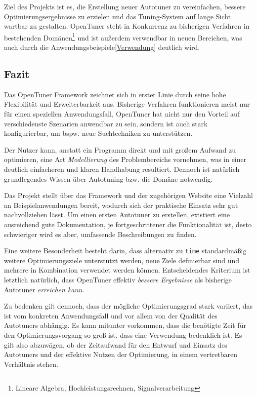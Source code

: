 \documentclass[a4paper,11pt]{scrartcl}
\newcommand{\bspw}{\mbox{bspw.}\xspace}
\newcommand{\bzw}{\mbox{bzw.}\xspace}
\begin{document}
Ziel des Projekts ist es, die Erstellung neuer Autotuner zu vereinfachen, bessere
Optimierungsergebnisse zu erzielen und das Tuning-System auf lange Sicht wartbar
zu gestalten. OpenTuner steht in Konkurrenz zu bisherigen Verfahren in 
bestehenden Domänen\footnote{Lineare Algebra, Hochleistungsrechnen, Signalverarbeitung}
und ist außerdem verwendbar in neuen Bereichen, was auch durch die Anwendungsbeispiele\ref{Verwendung} 
deutlich wird.

\subsection{Fazit}
Das OpenTuner Framework zeichnet sich in erster Linie durch seine hohe Flexibilität
und Erweiterbarkeit aus. Bisherige Verfahren funktionieren meist nur für einen speziellen
Anwendungsfall, OpenTuner hat nicht nur den Vorteil auf verschiedenste Szenarien anwendbar zu sein,
sondern ist auch stark konfigurierbar, um \bspw neue Suchtechniken zu unterstützen. \newline

Der Nutzer kann, anstatt ein Programm direkt und mit großem Aufwand zu optimieren,
eine Art \emph{Modellierung} des Problembereichs vornehmen, was in einer deutlich
einfacheren und klaren Handhabung resultiert. Dennoch ist natürlich grundlegendes
Wissen über Autotuning \bzw die Domäne notwendig. \newline

Das Projekt stellt über das Framework und der zugehörigen Website \cite{ot} eine
Vielzahl an Beispielanwendungen bereit, wodurch sich der praktische Einsatz sehr
gut nachvollziehen lässt. Um einen ersten Autotuner zu erstellen, existiert eine
ausreichend gute Dokumentation, je fortgeschrittener die Funktionalität ist,
desto schwieriger wird es aber, umfassende Beschreibungen zu finden. \newline

Eine weitere Besonderheit besteht darin, dass alternativ zu \texttt{time} 
standardmäßig weitere Optimierungsziele unterstützt werden, neue
Ziele definierbar sind und mehrere in Kombination verwendet werden können.
Entscheidendes Kriterium ist letztlich natürlich, dass OpenTuner 
effektiv \emph{bessere Ergebnisse} als bisherige Autotuner \emph{erreichen kann}. \newline

Zu bedenken gilt dennoch, dass der mögliche Optimierungsgrad stark variiert, das ist 
vom konkreten Anwendungsfall und vor allem von der Qualität des Autotuners abhängig.
Es kann mitunter vorkommen, dass die benötigte Zeit für den Optimierungsvorgang
so groß ist, dass eine Verwendung bedenklich ist.
Es gilt also abzuwägen, ob der Zeitaufwand für den Entwurf und Einsatz des Autotuners
und der effektive Nutzen der Optimierung, in einem vertretbaren Verhältnis stehen.
\newpage
\end{document}
